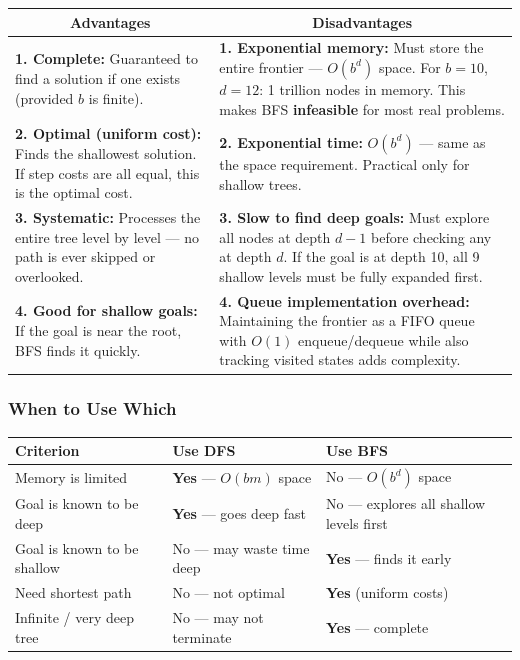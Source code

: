 \documentclass[12pt, a4paper]{article}
\begin{document}
\begin{center}
\renewcommand{\arraystretch}{1.4}
\begin{tabular}{p{5.5cm}|p{5.5cm}}
\toprule
\multicolumn{1}{c|}{\textbf{Advantages}} & \multicolumn{1}{c}{\textbf{Disadvantages}} \\
\midrule
\textbf{1. Complete:} Guaranteed to find a solution if one exists (provided $b$ is finite). & \textbf{1. Exponential memory:} Must store the entire frontier — $O(b^d)$ space. For $b{=}10$, $d{=}12$: 1 trillion nodes in memory. This makes BFS \textbf{infeasible} for most real problems. \\
\midrule
\textbf{2. Optimal (uniform cost):} Finds the shallowest solution. If step costs are all equal, this is the optimal cost. &
\textbf{2. Exponential time:} $O(b^d)$ — same as the space requirement. Practical only for shallow trees. \\
\midrule
\textbf{3. Systematic:} Processes the entire tree level by level — no path is ever skipped or overlooked. &
\textbf{3. Slow to find deep goals:} Must explore all nodes at depth $d{-}1$ before checking any at depth $d$. If the goal is at depth 10, all 9 shallow levels must be fully expanded first. \\
\midrule
\textbf{4. Good for shallow goals:} If the goal is near the root, BFS finds it quickly. &
\textbf{4. Queue implementation overhead:} Maintaining the frontier as a FIFO queue with $O(1)$ enqueue/dequeue while also tracking visited states adds complexity. \\
\bottomrule
\end{tabular}
\end{center}

\subsubsection*{When to Use Which}

\begin{center}
\renewcommand{\arraystretch}{1.3}
\begin{tabular}{l|l|l}
\toprule
\textbf{Criterion} & \textbf{Use DFS} & \textbf{Use BFS} \\
\midrule
Memory is limited & \textbf{Yes} — $O(bm)$ space & No — $O(b^d)$ space \\
Goal is known to be deep & \textbf{Yes} — goes deep fast & No — explores all shallow levels first \\
Goal is known to be shallow & No — may waste time deep & \textbf{Yes} — finds it early \\
Need shortest path & No — not optimal & \textbf{Yes} (uniform costs) \\
Infinite / very deep tree & No — may not terminate & \textbf{Yes} — complete \\
\bottomrule
\end{tabular}
\end{center}
\end{document}

